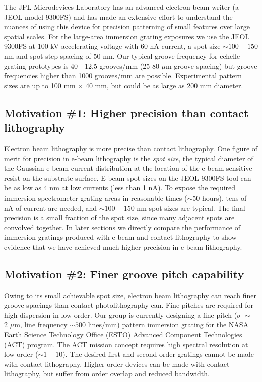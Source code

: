 The JPL Microdevices Laboratory has an advanced electron beam writer (a JEOL model 9300FS) and has made an extensive effort to understand the nuances of using this device for precision patterning of small features over large spatial scales.  For the large-area immersion grating exposures we use the JEOL 9300FS at 100 kV accelerating voltage with 60 nA current, a spot size $\sim 100-150$ nm and spot step spacing of 50 nm. Our typical groove frequency for echelle grating prototypes is 40 - 12.5 grooves/mm (25-80 $\mu$m groove spacing) but groove frequencies higher than 1000 grooves/mm are possible. Experimental pattern sizes are up to 100 mm $\times$ 40 mm, but could be as large as 200 mm diameter.

\subsection{Motivation \#1: Higher precision than contact lithography}
\label{sec:Precis}
Electron beam lithography is more precise than contact lithography.  One figure of merit for precision in e-beam lithography is the \emph{spot size}, the typical diameter of the Gaussian e-beam current distribution at the location of the e-beam sensitive resist on the substrate surface.  E-beam spot sizes on the JEOL 9300FS tool can be as low as 4 nm at low currents (less than 1 nA).  To expose the required immersion spectrometer grating areas in reasonable times ($\sim$50 hours), tens of nA of current are needed, and $\sim 100 - 150$ nm spot sizes are typical.  The final precision is a small fraction of the spot size, since many adjacent spots are convolved together.  In later sections we directly compare the performance of immersion gratings produced with e-beam and contact lithography to show evidence that we have achieved much higher precision in e-beam lithography.  

\subsection{Motivation \#2: Finer groove pitch capability}
Owing to its small achievable spot size, electron beam lithography can reach finer groove spacings than contact photolithography can.  Fine pitches are required for high dispersion in low order.  Our group is currently designing a fine pitch ($\sigma \; \sim$ 2 $\mu$m, line frequency $\sim 500$ lines/mm) pattern immersion grating for the NASA Earth Science Technology Office (ESTO) Advanced Component Technologies (ACT) program.  The ACT mission concept requires high spectral resolution at low order ($\sim1-10$).  The desired first and second order gratings cannot be made with contact lithography.  Higher order devices can be made with contact lithography, but suffer from order overlap and reduced bandwidth.


